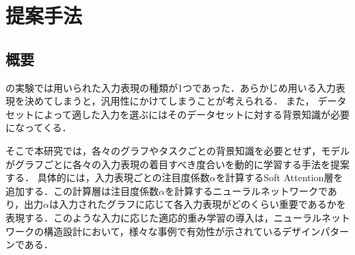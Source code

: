 \documentclass[twocolumn]{jarticle}
\begin{document}
\vspace{-10pt}
\section{提案手法}
\subsection{概要}
\cite{NNFP}の実験では用いられた入力表現の種類が1つであった．あらかじめ用いる入力表現を決めてしまうと，汎用性にかけてしまうことが考えられる．
また， データセットによって適した入力を選ぶにはそのデータセットに対する背景知識が必要になってくる．

そこで本研究では，各々のグラフやタスクごとの背景知識を必要とせず，モデルがグラフごとに各々の入力表現の着目すべき度合いを動的に学習する手法を提案する．
具体的には，入力表現ごとの注目度係数$\alpha$を計算するSoft Attention層を追加する．この計算層は注目度係数$\alpha$を計算するニューラルネットワークであり，出力$\alpha$は入力されたグラフに応じて各入力表現がどのくらい重要であるかを表現する．このような入力に応じた適応的重み学習の導入は，ニューラルネットワークの構造設計において，様々な事例で有効性が示されているデザインパターンである．

\vspace{-6pt}
\end{document}
